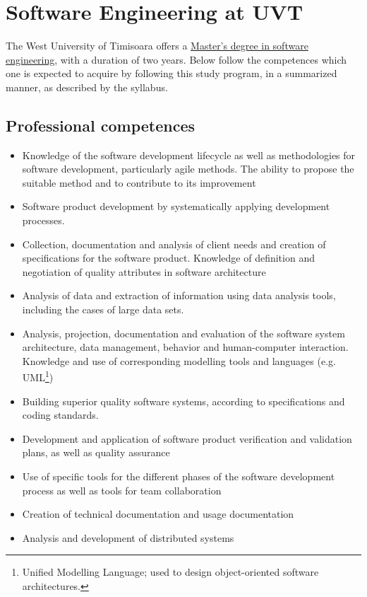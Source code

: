 \documentclass[a4paper]{article}
\begin{document}
    \newpage
    \section{Software Engineering at UVT}

        The West University of Timisoara offers a \href{https://info.uvt.ro/programe-master/inginerie-software/}{Master's degree in software engineering}, with a duration of two years. Below follow the competences which one is expected to acquire by following this study program, in a summarized manner, as described by the syllabus.

        \subsection*{Professional competences}
            \begin{itemize}
                \item Knowledge of the software development lifecycle as well as methodologies for software development, particularly agile methods. The ability to propose the suitable method and to contribute to its improvement
                \item Software product development by systematically applying development processes.
                \item Collection, documentation and analysis of client needs and creation of specifications for the software product. Knowledge of definition and negotiation of quality attributes in software architecture
                \item Analysis of data and extraction of information using data analysis tools, including the cases of large data sets.
                \item Analysis, projection, documentation and evaluation of the software system architecture, data management, behavior and human-computer interaction. Knowledge and use of corresponding modelling tools and languages (e.g. UML\footnote{Unified Modelling Language; used to design object-oriented software architectures.})
                \item Building superior quality software systems, according to specifications and coding standards.
                \item Development and application of software product verification and validation plans, as well as quality assurance
                \item Use of specific tools for the different phases of the software development process as well as tools for team collaboration
                \item Creation of technical documentation and usage documentation
                \item Analysis and development of distributed systems
            \end{itemize}
\end{document}
